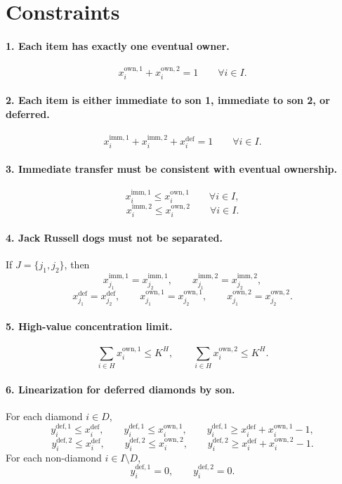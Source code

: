 \section*{Constraints}

\paragraph{1. Each item has exactly one eventual owner.}
\[
x^{\mathrm{own},1}_i + x^{\mathrm{own},2}_i = 1
\qquad \forall i\in I.
\]

\paragraph{2. Each item is either immediate to son 1, immediate to son 2, or deferred.}
\[
x^{\mathrm{imm},1}_i + x^{\mathrm{imm},2}_i + x^{\mathrm{def}}_i = 1
\qquad \forall i\in I.
\]

\paragraph{3. Immediate transfer must be consistent with eventual ownership.}
\[
x^{\mathrm{imm},1}_i \le x^{\mathrm{own},1}_i
\qquad \forall i\in I,
\]
\[
x^{\mathrm{imm},2}_i \le x^{\mathrm{own},2}_i
\qquad \forall i\in I.
\]

\paragraph{4. Jack Russell dogs must not be separated.}
If $J=\{j_1,j_2\}$, then
\[
x^{\mathrm{imm},1}_{j_1}=x^{\mathrm{imm},1}_{j_2},
\qquad
x^{\mathrm{imm},2}_{j_1}=x^{\mathrm{imm},2}_{j_2},
\]
\[
x^{\mathrm{def}}_{j_1}=x^{\mathrm{def}}_{j_2},
\qquad
x^{\mathrm{own},1}_{j_1}=x^{\mathrm{own},1}_{j_2},
\qquad
x^{\mathrm{own},2}_{j_1}=x^{\mathrm{own},2}_{j_2}.
\]

\paragraph{5. High-value concentration limit.}
\[
\sum_{i\in H} x^{\mathrm{own},1}_i \le K^{H},
\qquad
\sum_{i\in H} x^{\mathrm{own},2}_i \le K^{H}.
\]

\paragraph{6. Linearization for deferred diamonds by son.}
For each diamond $i\in D$,
\[
y^{\mathrm{def},1}_i \le x^{\mathrm{def}}_i,\qquad
y^{\mathrm{def},1}_i \le x^{\mathrm{own},1}_i,\qquad
y^{\mathrm{def},1}_i \ge x^{\mathrm{def}}_i + x^{\mathrm{own},1}_i - 1,
\]
\[
y^{\mathrm{def},2}_i \le x^{\mathrm{def}}_i,\qquad
y^{\mathrm{def},2}_i \le x^{\mathrm{own},2}_i,\qquad
y^{\mathrm{def},2}_i \ge x^{\mathrm{def}}_i + x^{\mathrm{own},2}_i - 1.
\]
For each non-diamond $i\in I\setminus D$,
\[
y^{\mathrm{def},1}_i = 0,\qquad y^{\mathrm{def},2}_i = 0.
\]

